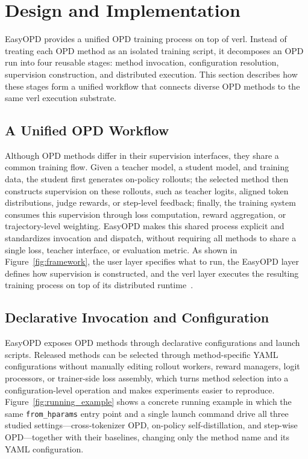 \section{Design and Implementation}




EasyOPD provides a unified OPD training process on top of verl. Instead of treating each OPD method as an isolated training script, it decomposes an OPD run into four reusable stages: method invocation, configuration resolution, supervision construction, and distributed execution. This section describes how these stages form a unified workflow that connects diverse OPD methods to the same verl execution substrate.

\subsection{A Unified OPD Workflow}

Although OPD methods differ in their supervision interfaces, they share a common training flow. Given a teacher model, a student model, and training data, the student first generates on-policy rollouts; the selected method then constructs supervision on these rollouts, such as teacher logits, aligned token distributions, judge rewards, or step-level feedback; finally, the training system consumes this supervision through loss computation, reward aggregation, or trajectory-level weighting. EasyOPD makes this shared process explicit and standardizes invocation and dispatch, without requiring all methods to share a single loss, teacher interface, or evaluation metric. As shown in Figure~\ref{fig:framework}, the user layer specifies what to run, the EasyOPD layer defines how supervision is constructed, and the verl layer executes the resulting training process on top of its distributed runtime~\citep{sheng2024hybridflow_verl}.

\subsection{Declarative Invocation and Configuration}

EasyOPD exposes OPD methods through declarative configurations and launch scripts. Released methods can be selected through method-specific YAML configurations without manually editing rollout workers, reward managers, logit processors, or trainer-side loss assembly, which turns method selection into a configuration-level operation and makes experiments easier to reproduce. Figure~\ref{fig:running_example} shows a concrete running example in which the same \texttt{from\_hparams} entry point and a single launch command drive all three studied settings---cross-tokenizer OPD, on-policy self-distillation, and step-wise OPD---together with their baselines, changing only the method name and its YAML configuration.

